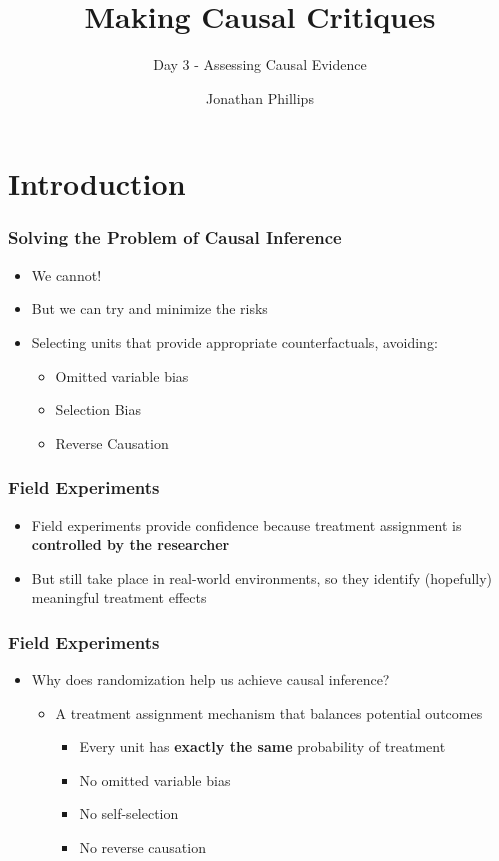 \documentclass[xcolor=x11names,compress]{beamer}\usepackage[]{graphicx}\usepackage[]{color}
\title{Making Causal Critiques}
\subtitle{Day 3 - Assessing Causal Evidence}
\author{Jonathan Phillips}
\renewcommand{\(}{\begin{columns}}
\renewcommand{\)}{\end{columns}}
\newcommand{\<}[1]{\begin{column}{#1}}
\renewcommand{\>}{\end{column}}
\begin{document}
\frame{\titlepage}

\section{Introduction}

\begin{frame}
\frametitle{Solving the Problem of Causal Inference}
\begin{itemize}
\item We cannot!
\item But we can try and minimize the risks
\item Selecting units that provide appropriate counterfactuals, avoiding:
\begin{itemize}
\item Omitted variable bias
\item Selection Bias
\item Reverse Causation
\end{itemize}
\end{itemize}
\end{frame}

\begin{frame} 
\frametitle{Field Experiments}
\begin{itemize}
\item Field experiments provide confidence because treatment assignment is \textbf{controlled by the researcher}
\item But still take place in real-world environments, so they identify (hopefully) meaningful treatment effects
\end{itemize}
\end{frame}

\begin{frame}
\frametitle{Field Experiments}
\begin{itemize}
\item Why does randomization help us achieve causal inference?
\pause
\begin{itemize}
\item A treatment assignment mechanism that balances potential outcomes
\begin{itemize}
\item Every unit has \textbf{exactly the same} probability of treatment
\item No omitted variable bias
\item No self-selection
\item No reverse causation
\end{itemize}
\end{itemize}
\end{itemize}
\end{frame}
\end{document}

